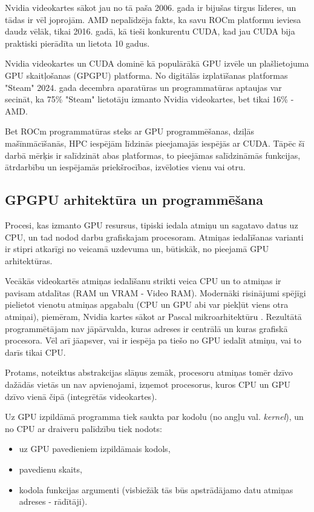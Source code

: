 \documentclass[12pt]{report}%
\theoremstyle{definition}
\begin{document}
Nvidia videokartes sākot jau no tā paša 2006. gada ir bijušas tirgus līderes, un tādas ir vēl joprojām.
AMD nepalīdzēja fakts, ka savu ROCm platformu ieviesa daudz vēlāk, tikai 2016. gadā, kā tieši konkurentu CUDA,
kad jau CUDA bija praktiski pierādīta un lietota 10 gadus.

Nvidia videokartes un CUDA dominē kā populārākā GPU izvēle un plašlietojuma GPU skaitļošanas (GPGPU)
platforma. No digitālās izplatīšanas platformas "Steam" 2024. gada decembra aparatūras un programmatūras
aptaujas var secināt, ka 75\% "Steam" lietotāju izmanto Nvidia videokartes, bet tikai 16\% - AMD.
\cite{steam_survey}

Bet ROCm programmatūras steks ar GPU programmēšanas, dziļās mašīnmācīšanās, HPC iespējām līdzinās
pieejamajās iespējās ar CUDA. Tāpēc šī darbā mērķis ir salīdzināt abas platformas, to pieejāmas salīdzināmās
funkcijas, ātrdarbību un iespējamās priekšrocības, izvēloties vienu vai otru.
\begin{center}
\chapter{GPGPU arhitektūra un programmēšana}
\end{center}

Procesi, kas izmanto GPU resursus, tipiski iedala atmiņu un sagatavo datus uz CPU, un tad nodod darbu
grafiskajam procesoram. Atmiņas iedalīšanas varianti ir stipri atkarīgi no veicamā uzdevuma un, būtiskāk, no
pieejamā GPU arhitektūras.

Vecākās videokartēs atmiņas iedalīšanu strikti veica CPU un to atmiņas ir pavisam atdalītas 
(RAM un VRAM - Video RAM). Modernāki risinājumi spējīgi pielietot vienotu
atmiņas apgabalu (CPU un GPU abi var piekļūt viens otra atmiņai), piemēram, Nvidia kartes sākot ar Pascal
mikroarhitektūru \cite{nvidia_tesla_p100}. Rezultātā programmētājam nav jāpārvalda,
kuras adreses ir centrālā un kuras grafiskā procesora. Vēl arī jāapsver, vai ir iespēja pa tiešo no GPU
iedalīt atmiņu, vai to darīs tikai CPU.

Protams, noteiktus abstrakcijas slāņus zemāk, procesoru atmiņas tomēr dzīvo dažādās vietās un nav apvienojami,
izņemot procesorus, kuros CPU un GPU dzīvo vienā čipā (integrētās videokartes).

Uz GPU izpildāmā programma tiek saukta par kodolu (no angļu val. \textit{kernel}), un no CPU ar draiveru
palīdzību tiek nodots:
\begin{itemize}
    \item uz GPU pavedieniem izpildāmais kodols,
    \item pavedienu skaits,
    \item kodola funkcijas argumenti (visbiežāk tās būs apstrādājamo datu atmiņas adreses - rādītāji).
\end{itemize}
\end{document}
